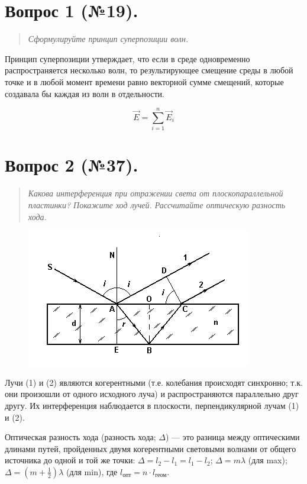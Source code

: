 \section*{Вопрос 1 (№19).}
\begin{quote}
    \textit{Сформулируйте принцип суперпозиции волн.}
\end{quote}

Принцип суперпозиции утверждает, что если в среде одновременно распространяется несколько волн, то результирующее смещение среды в любой точке и в любой момент времени равно векторной сумме смещений, которые создавала бы каждая из волн в отдельности.

\begin{equation*}
    \vec{E} = \sum_{i=1}^{n} \vec{E}_i
\end{equation*}



\section*{Вопрос 2 (№37).}
\begin{quote}
    \textit{Какова интерференция при отражении света от плоскопараллельной пластинки? Покажите ход лучей. Рассчитайте оптическую разность хода.}
\end{quote}
\begin{figure}[H]
    \centering
    \includegraphics[width=0.5\linewidth]{figs/interferenc.png}
\end{figure}
Лучи (1) и (2) являются когерентными (т.е. колебания происходят синхронно; т.к. они произошли от одного исходного луча) и распространяются параллельно друг другу. Их интерференция наблюдается в плоскости, перпендикулярной лучам (1) и (2).

Оптическая разность хода (разность хода; $\Delta$) --- это разница между оптическими длинами путей, пройденных двумя когерентными световыми волнами от общего источника до одной и той же точки: $\Delta = l_2-l_1=l_1-l_2$; $\Delta = m\lambda$ (для max); $\Delta = (m+\frac12)\lambda$ (для min), где $l_\text{опт}=n\cdot l_\text{геом}$.

